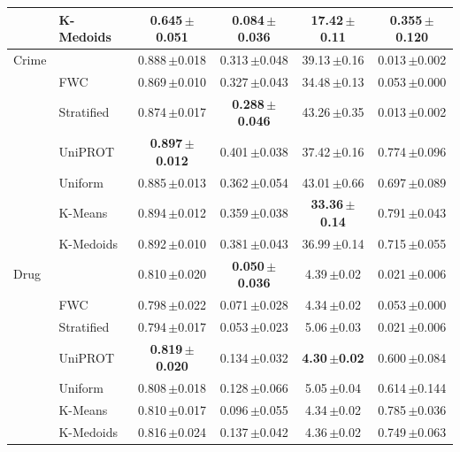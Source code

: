 \begin{tabular}{llcccc}
 & K-Medoids & 0.645\,{\scriptsize$\pm$0.051} & 0.084\,{\scriptsize$\pm$0.036} & 17.42\,{\scriptsize$\pm$0.11} & 0.355\,{\scriptsize$\pm$0.120}\\
\midrule
Crime & \method{} & 0.888\,{\scriptsize$\pm$0.018} & 0.313\,{\scriptsize$\pm$0.048} & 39.13\,{\scriptsize$\pm$0.16} & 0.013\,{\scriptsize$\pm$0.002}\\
 & FWC & 0.869\,{\scriptsize$\pm$0.010} & 0.327\,{\scriptsize$\pm$0.043} & 34.48\,{\scriptsize$\pm$0.13} & 0.053\,{\scriptsize$\pm$0.000}\\
 & Stratified & 0.874\,{\scriptsize$\pm$0.017} & \textbf{0.288\,{\scriptsize$\pm$0.046}} & 43.26\,{\scriptsize$\pm$0.35} & 0.013\,{\scriptsize$\pm$0.002}\\
 & UniPROT & \textbf{0.897\,{\scriptsize$\pm$0.012}} & 0.401\,{\scriptsize$\pm$0.038} & 37.42\,{\scriptsize$\pm$0.16} & 0.774\,{\scriptsize$\pm$0.096}\\
 & Uniform & 0.885\,{\scriptsize$\pm$0.013} & 0.362\,{\scriptsize$\pm$0.054} & 43.01\,{\scriptsize$\pm$0.66} & 0.697\,{\scriptsize$\pm$0.089}\\
 & K-Means & 0.894\,{\scriptsize$\pm$0.012} & 0.359\,{\scriptsize$\pm$0.038} & \textbf{33.36\,{\scriptsize$\pm$0.14}} & 0.791\,{\scriptsize$\pm$0.043}\\
 & K-Medoids & 0.892\,{\scriptsize$\pm$0.010} & 0.381\,{\scriptsize$\pm$0.043} & 36.99\,{\scriptsize$\pm$0.14} & 0.715\,{\scriptsize$\pm$0.055}\\
\midrule
Drug & \method{} & 0.810\,{\scriptsize$\pm$0.020} & \textbf{0.050\,{\scriptsize$\pm$0.036}} & 4.39\,{\scriptsize$\pm$0.02} & 0.021\,{\scriptsize$\pm$0.006}\\
 & FWC & 0.798\,{\scriptsize$\pm$0.022} & 0.071\,{\scriptsize$\pm$0.028} & 4.34\,{\scriptsize$\pm$0.02} & 0.053\,{\scriptsize$\pm$0.000}\\
 & Stratified & 0.794\,{\scriptsize$\pm$0.017} & 0.053\,{\scriptsize$\pm$0.023} & 5.06\,{\scriptsize$\pm$0.03} & 0.021\,{\scriptsize$\pm$0.006}\\
 & UniPROT & \textbf{0.819\,{\scriptsize$\pm$0.020}} & 0.134\,{\scriptsize$\pm$0.032} & \textbf{4.30\,{\scriptsize$\pm$0.02}} & 0.600\,{\scriptsize$\pm$0.084}\\
 & Uniform & 0.808\,{\scriptsize$\pm$0.018} & 0.128\,{\scriptsize$\pm$0.066} & 5.05\,{\scriptsize$\pm$0.04} & 0.614\,{\scriptsize$\pm$0.144}\\
 & K-Means & 0.810\,{\scriptsize$\pm$0.017} & 0.096\,{\scriptsize$\pm$0.055} & 4.34\,{\scriptsize$\pm$0.02} & 0.785\,{\scriptsize$\pm$0.036}\\
 & K-Medoids & 0.816\,{\scriptsize$\pm$0.024} & 0.137\,{\scriptsize$\pm$0.042} & 4.36\,{\scriptsize$\pm$0.02} & 0.749\,{\scriptsize$\pm$0.063}\\
\bottomrule
\end{tabular}
